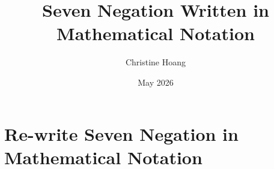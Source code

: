 \documentclass{article}
\title{Seven Negation Written in Mathematical Notation}
\author{Christine Hoang}
\date{May 2026}
\begin{document}
\maketitle

\section{Re-write Seven Negation in Mathematical Notation}
\end{document}
